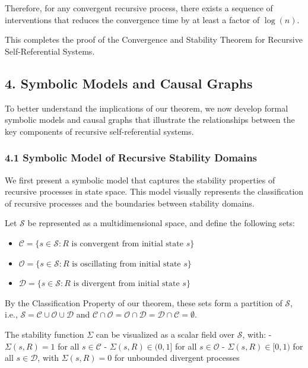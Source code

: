 \documentclass[
]{article}
\providecommand{\tightlist}{%
  \setlength{\itemsep}{0pt}\setlength{\parskip}{0pt}}
\begin{document}
Therefore, for any convergent recursive process, there exists a sequence
of interventions that reduces the convergence time by at least a factor
of \(\log(n)\).

This completes the proof of the Convergence and Stability Theorem for
Recursive Self-Referential Systems.

\subsection{4. Symbolic Models and Causal
Graphs}\label{symbolic-models-and-causal-graphs}

To better understand the implications of our theorem, we now develop
formal symbolic models and causal graphs that illustrate the
relationships between the key components of recursive self-referential
systems.

\subsubsection{4.1 Symbolic Model of Recursive Stability
Domains}\label{symbolic-model-of-recursive-stability-domains}

We first present a symbolic model that captures the stability properties
of recursive processes in state space. This model visually represents
the classification of recursive processes and the boundaries between
stability domains.

Let \(\mathcal{S}\) be represented as a multidimensional space, and
define the following sets:

\begin{itemize}
\tightlist
\item
  \(\mathcal{C} = \{s \in \mathcal{S} : R \text{ is convergent from initial state } s\}\)
\item
  \(\mathcal{O} = \{s \in \mathcal{S} : R \text{ is oscillating from initial state } s\}\)
\item
  \(\mathcal{D} = \{s \in \mathcal{S} : R \text{ is divergent from initial state } s\}\)
\end{itemize}

By the Classification Property of our theorem, these sets form a
partition of \(\mathcal{S}\), i.e.,
\(\mathcal{S} = \mathcal{C} \cup \mathcal{O} \cup \mathcal{D}\) and
\(\mathcal{C} \cap \mathcal{O} = \mathcal{O} \cap \mathcal{D} = \mathcal{D} \cap \mathcal{C} = \emptyset\).

The stability function \(\Sigma\) can be visualized as a scalar field
over \(\mathcal{S}\), with: - \(\Sigma(s, R) = 1\) for all
\(s \in \mathcal{C}\) - \(\Sigma(s, R) \in (0,1]\) for all
\(s \in \mathcal{O}\) - \(\Sigma(s, R) \in [0,1)\) for all
\(s \in \mathcal{D}\), with \(\Sigma(s, R) = 0\) for unbounded divergent
processes
\end{document}
